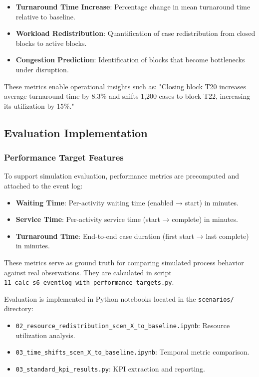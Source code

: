     \begin{itemize}
        \item \textbf{Turnaround Time Increase}: Percentage change in mean turnaround time relative to baseline.
        \item \textbf{Workload Redistribution}: Quantification of case redistribution from closed blocks to active blocks.
        \item \textbf{Congestion Prediction}: Identification of blocks that become bottlenecks under disruption.
    \end{itemize}
    
    These metrics enable operational insights such as: "Closing block T20 increases average turnaround time by 8.3\% and shifts 1,200 cases to block T22, increasing its utilization by 15\%."

\subsection{Evaluation Implementation}
        
        \subsubsection{Performance Target Features}
    
        To support simulation evaluation, performance metrics are precomputed and attached to the event log:
        
        \begin{itemize}
            \item \textbf{Waiting Time}: Per-activity waiting time (enabled → start) in minutes.
            \item \textbf{Service Time}: Per-activity service time (start → complete) in minutes.
            \item \textbf{Turnaround Time}: End-to-end case duration (first start → last complete) in minutes.
        \end{itemize}
        
        These metrics serve as ground truth for comparing simulated process behavior against real observations. They are calculated in script \texttt{11\_calc\_s6\_eventlog\_with\_performance\_targets.py}.

        Evaluation is implemented in Python notebooks located in the \texttt{scenarios/} directory:
        
        \begin{itemize}
            \item \texttt{02\_resource\_redistribution\_scen\_X\_to\_baseline.ipynb}: Resource utilization analysis.
            \item \texttt{03\_time\_shifts\_scen\_X\_to\_baseline.ipynb}: Temporal metric comparison.
            \item \texttt{03\_standard\_kpi\_results.py}: KPI extraction and reporting.
        \end{itemize}
        
